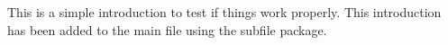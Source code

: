 \documentclass[../Main.tex]{subfiles}
\begin{document}
    This is a simple introduction to test if things work properly. This introduction has been added to the main file using the subfile package.
\end{document}
